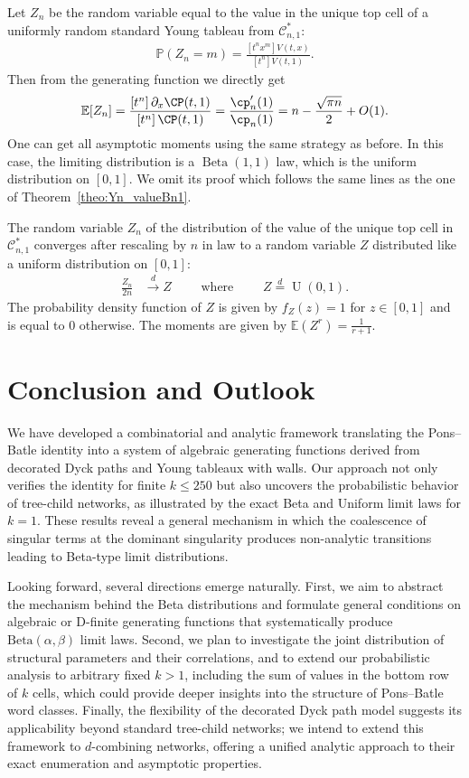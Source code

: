 \documentclass[a4paper,UKenglish,cleveref, autoref, thm-restate]{lipics-v2021}
\newcommand{\Cc}{\mathcal{C}}
\newcommand{\E}{\mathbb{E}}
\begin{document}
Let $Z_n$ be the random variable equal to the value in the unique top cell of a uniformly random standard Young tableau from $\Cc^*_{n,1}$:
\begin{align*}
    \mathbb{P}(Z_n=m) = \frac{[t^{n} x^m]V(t,x)}{[t^{n}]V(t,1)}.
\end{align*}
Then from the generating function we directly get
\[
\mathbb{E}[Z_n]
=
\frac{[t^n]\,\partial_x \CP(t,1)}{[t^n]\,\CP(t,1)}=\frac{\cp'_n(1)}{\cp_n(1)}
=
n-\frac{\sqrt{\pi n}}{2}+O(1).
\]
One can get all asymptotic moments using the same strategy as before.
In this case, the limiting distribution is a $\operatorname{Beta}(1,1)$ law, which is the uniform distribution on $[0,1]$.
We omit its proof which follows the same lines as the one of Theorem~\ref{theo:Yn_valueBn1}.
\begin{theorem}   
The random variable $Z_n$ of the distribution of the value of the unique top cell in $\mathcal{C}^*_{n,1}$ converges after rescaling by $n$ in law to a random variable $Z$ distributed like a uniform distribution on $[0,1]$: 
\begin{align*}
    \frac{Z_n}{2n}  &\stackrel{d}{\to} Z \qquad \text{ where } \qquad
    Z \stackrel{d}{=}\operatorname{U}(0,1).
\end{align*}
The probability density function of $Z$ is given by $f_Z(z) = 1$ for $z \in [0,1]$ and is equal to $0$ otherwise. 
The moments are given by $\E(Z^r) = \frac{1}{r+1}$.
\end{theorem}

\section{Conclusion and Outlook}
\label{sec:conclusion}
We have developed a combinatorial and analytic framework translating the Pons--Batle identity into a system of algebraic generating functions derived from decorated Dyck paths and Young tableaux with walls. Our approach not only verifies the identity for finite $k \le 250$ but also uncovers the probabilistic behavior of tree-child networks, as illustrated by the exact Beta and Uniform limit laws for $k=1$. These results reveal a general mechanism in which the coalescence of singular terms at the dominant singularity produces non-analytic transitions leading to Beta-type limit distributions.

Looking forward, several directions emerge naturally. First, we aim to abstract the mechanism behind the Beta distributions and formulate general conditions on algebraic or D-finite generating functions that systematically produce $\mathrm{Beta}(\alpha, \beta)$ limit laws. Second, we plan to investigate the joint distribution of structural parameters and their correlations, and to extend our probabilistic analysis to arbitrary fixed $k>1$, including the sum of values in the bottom row of $k$ cells, which could provide deeper insights into the structure of Pons--Batle word classes. Finally, the flexibility of the decorated Dyck path model suggests its applicability beyond standard tree-child networks; we intend to extend this framework to $d$-combining networks, offering a unified analytic approach to their exact enumeration and asymptotic properties.
\end{document}

